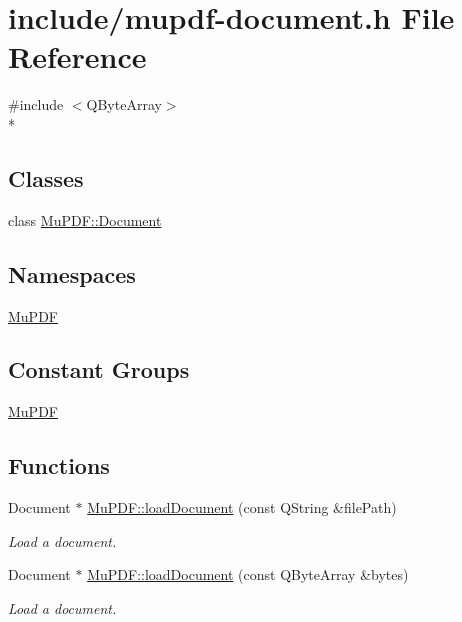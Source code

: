 \hypertarget{mupdf-document_8h}{\section{include/mupdf-\/document.h File Reference}
\label{mupdf-document_8h}
}
{\ttfamily \#include $<$Q\-Byte\-Array$>$}\\*
\subsection*{Classes}
\begin{DoxyCompactItemize}
\item 
class \hyperlink{class_mu_p_d_f_1_1_document}{Mu\-P\-D\-F\-::\-Document}
\end{DoxyCompactItemize}
\subsection*{Namespaces}
\begin{DoxyCompactItemize}
\item 
\hyperlink{namespace_mu_p_d_f}{Mu\-P\-D\-F}
\end{DoxyCompactItemize}
\subsection*{Constant Groups}
\begin{DoxyCompactItemize}
\item 
\hyperlink{namespace_mu_p_d_f}{Mu\-P\-D\-F}
\end{DoxyCompactItemize}
\subsection*{Functions}
\begin{DoxyCompactItemize}
\item 
Document $\ast$ \hyperlink{namespace_mu_p_d_f_a5cf746094bc9648aca0d4a83e3ac44b3}{Mu\-P\-D\-F\-::load\-Document} (const Q\-String \&file\-Path)
\begin{DoxyCompactList}\small\item\em Load a document. \end{DoxyCompactList}\item 
Document $\ast$ \hyperlink{namespace_mu_p_d_f_a294a09188a3dcab290679752dfc8d52b}{Mu\-P\-D\-F\-::load\-Document} (const Q\-Byte\-Array \&bytes)
\begin{DoxyCompactList}\small\item\em Load a document. \end{DoxyCompactList}\end{DoxyCompactItemize}
